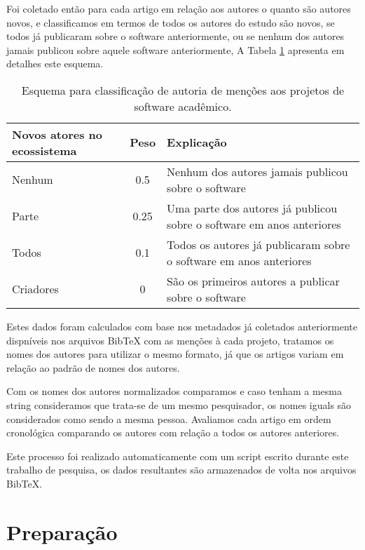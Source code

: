 Foi coletado então para cada artigo em relação aos autores o quanto são
autores novos, e classificamos em termos de todos os autores do estudo
são novos, se todos já publicaram sobre o software anteriormente, ou se
nenhum dos autores jamais publicou sobre aquele software anteriormente, A Tabela
\ref{esquema-de-autoria} apresenta em detalhes este esquema.


\begin{table}[h]
\caption{Esquema para classificação de autoria de menções aos projetos de software acadêmico.}
\centering
\begin{tabular}{ l c p{8cm} }
  \hline
  Novos atores no ecossistema & Peso & Explicação \\
  \hline
  Nenhum    & 0.5  & Nenhum dos autores jamais publicou sobre o software \\
  Parte     & 0.25 & Uma parte dos autores já publicou sobre o software em anos anteriores \\
  Todos     & 0.1  & Todos os autores já publicaram sobre o software em anos anteriores \\
  Criadores & 0    & São os primeiros autores a publicar sobre o software \\
  \hline
\end{tabular}
\label{esquema-de-autoria}
\end{table}

Estes dados foram calculados com base nos metadados já coletados anteriormente
dispníveis nos arquivos BibTeX com as menções à cada projeto, tratamos os nomes
dos autores para utilizar o mesmo formato, já que os artigos variam em relação
ao padrão de nomes dos autores.

Com os nomes dos autores normalizados comparamos e caso tenham a mesma string
consideramos que trata-se de um mesmo pesquisador, os nomes iguals são
considerados como sendo a mesma pessoa. Avaliamos cada artigo em ordem
cronológica comparando os autores com relação a todos os autores anteriores.

Este processo foi realizado automaticamente com um script escrito durante este
trabalho de pesquisa, os dados resultantes são armazenados de volta nos
arquivos BibTeX.

\section{Preparação}

